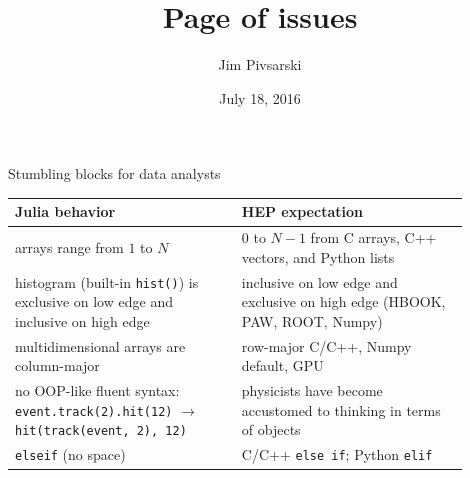 \documentclass{beamer}
\title[2016-07-18-julia]{Page of issues}
\author{Jim Pivsarski}
\institute{Princeton -- DIANA}
\date{July 18, 2016}
\begin{document}




\begin{frame}{Stumbling blocks for data analysts}
\vspace{0.4 cm}
\renewcommand{\arraystretch}{1.2}
\begin{tabular}{>{\raggedright}p{0.45\linewidth} >{\raggedright\arraybackslash}p{0.45\linewidth}}
{\bf Julia behavior} & {\bf HEP expectation} \\\hline
arrays range from $1$ to $N$ & $0$ to $N-1$ from C arrays, C++ vectors, and Python lists \\\hline
histogram (built-in {\tt \scriptsize hist()}) is exclusive on low edge and inclusive on high edge & inclusive on low edge and exclusive on high edge (HBOOK, PAW, ROOT, Numpy) \\\hline
multidimensional arrays are column-major & row-major C/C++, Numpy default, GPU \\\hline
no OOP-like fluent syntax: {\tt \scriptsize event.track(2).hit(12)} $\to$ {\tt \scriptsize hit(track(event, 2), 12)} & physicists have become accustomed to thinking in terms of objects \\\hline
{\tt \scriptsize elseif} (no space) & C/C++ {\tt \scriptsize else if}; Python {\tt \scriptsize elif}
\end{tabular}
\end{frame}
\end{document}
